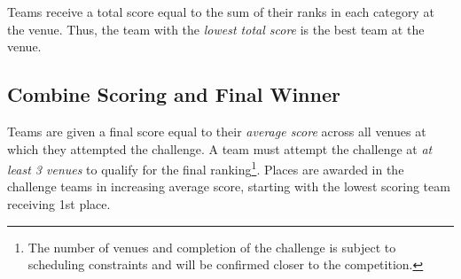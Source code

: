 Teams receive a total score equal to the sum of their ranks in each category at the venue. 
Thus, the team with the \textit{lowest total score} is the best team at the venue.

\subsection{Combine Scoring and Final Winner}
Teams are given a final score equal to their \textit{average score} across all venues at which they attempted the challenge. A team must attempt the challenge at \textit{at least 3 venues} to qualify for the final ranking\footnote{The number of venues and completion of the challenge is subject to scheduling constraints and will be confirmed closer to the competition.}.
Places are awarded in the challenge teams in increasing average score, starting with the lowest scoring team receiving 1st place.

